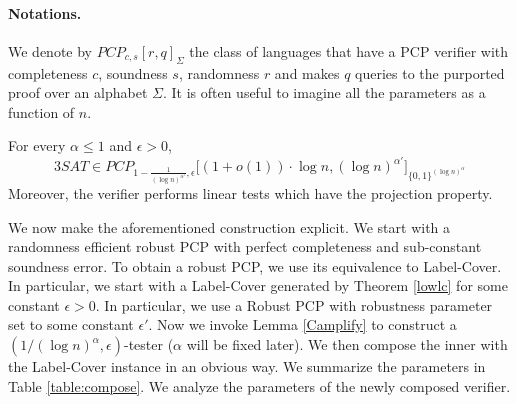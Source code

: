 \paragraph {Notations.}  We denote by $PCP_{c,s}\left[r, q\right]_\Sigma$ the class of
languages that have a PCP verifier with completeness $c$, soundness
$s$, randomness $r$ and makes $q$ queries to the purported proof over
an alphabet $\Sigma$. It is often useful to imagine all the parameters as a function of $n$.

\begin{theorem} \label{composedPCP}
For every $\alpha \le 1$ and $\epsilon > 0$, 
\[
		3SAT \in PCP_{{1 - \frac{1}{\left(\log n\right)^{\alpha'}}}, \epsilon } \big[ \left(1 + o\left(1\right) \right) \cdot \log n,  (\log n)^{\alpha'} \big ]_{\{0,1\}^{(\log n)^\alpha}}
\]
Moreover, the verifier performs linear tests which have the
projection property.
\end{theorem}
 We now make the aforementioned construction
explicit.  We start with a randomness efficient robust PCP with
perfect completeness and sub-constant soundness error. To obtain a
robust PCP, we use its equivalence to {\sc Label-Cover}. In particular, we
start with a {\sc Label-Cover} generated by Theorem \ref{lowlc} for some
constant $\epsilon > 0$. In particular, we use a Robust PCP with robustness 
parameter set to some constant $\epsilon'$. Now we invoke
Lemma \ref{Camplify} to construct a $(1/(\log n)^\alpha, \epsilon)$-tester 
($\alpha$ will be fixed later). We then compose the inner with the {\sc Label-Cover} instance in an
obvious way. We summarize the parameters in Table \ref{table:compose}. 
We analyze the parameters of the newly composed verifier.


